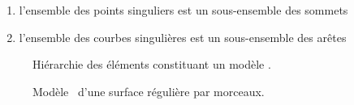 \begin{enumerate}
	\item l'ensemble des points singuliers est un sous-ensemble des sommets \brep
	\item l'ensemble des courbes singulières est un sous-ensemble des arêtes \brep
\end{enumerate}

\begin{figure}
	\centering
	
	\caption{Hiérarchie des éléments constituant un modèle \brep.}
	\label{fig:BRep_hierarchy}
\end{figure}



\begin{figure}
	\centering
	
	\caption{Modèle \brep\ d'une surface régulière par morceaux.}
	\label{fig:BRep}
\end{figure}



